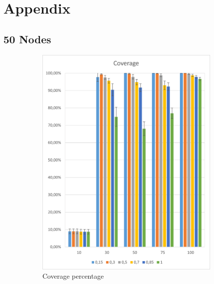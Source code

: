 \section{Appendix}

\subsection{50 Nodes}
\begin{figure}[H]
\centering
\begin{subfigure}{.5\textwidth}
  \centering
  \includegraphics[width=1\linewidth]{./images/50CoverageCI.png}
  \caption{Coverage percentage}
  \label{fig:sub1}
\end{subfigure}%
\begin{subfigure}{.5\textwidth}
  \centering

\end{subfigure}
\end{figure}
